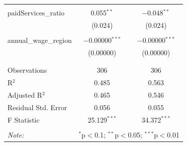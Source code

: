 \documentclass[alpha-refs]{wiley-article-05g}
\begin{document}
\begin{table}[!htbp]
\begin{tabular}{@{\extracolsep{5pt}}lcc}
		& & \\ 
		paidServices\_ratio & 0.055$^{**}$ & $-$0.048$^{**}$ \\ 
		& (0.024) & (0.024) \\ 
		& & \\ 
		annual\_wage\_region & $-$0.00000$^{***}$ & $-$0.00000$^{***}$ \\ 
		& (0.00000) & (0.00000) \\ 
		& & \\ 
		\hline \\[-1.8ex] 
		Observations & 306 & 306 \\ 
		R$^{2}$ & 0.485 & 0.563 \\ 
		Adjusted R$^{2}$ & 0.465 & 0.546 \\ 
		Residual Std. Error & 0.056 & 0.055 \\ 
		F Statistic & 25.129$^{***}$ & 34.372$^{***}$ \\ 
		\hline 
		\hline \\[-1.8ex] 
		\textit{Note:}  & \multicolumn{2}{r}{$^{*}$p$<$0.1; $^{**}$p$<$0.05; $^{***}$p$<$0.01} \\ 
	\end{tabular} 
\end{table} 


\newpage
\printbibliography
\end{document}
